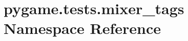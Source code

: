 \hypertarget{namespacepygame_1_1tests_1_1mixer__tags}{}\section{pygame.\+tests.\+mixer\+\_\+tags Namespace Reference}
\label{namespacepygame_1_1tests_1_1mixer__tags}
